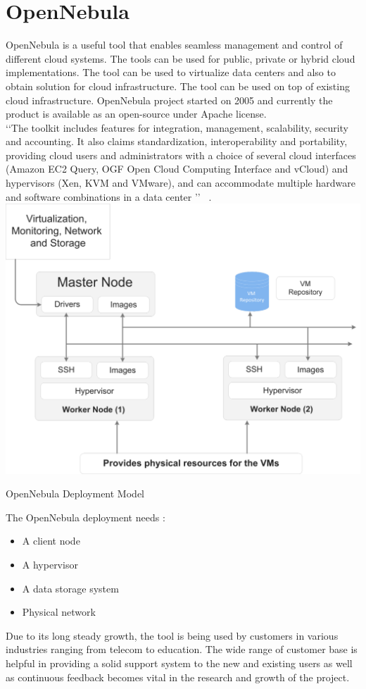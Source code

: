 \usepackage{graphicx}
\graphicspath{ {images/} }
\section{OpenNebula}

OpenNebula is a useful tool that enables seamless management and control of different cloud systems.
The tools can be used for public, private or hybrid cloud implementations.
The tool can be used to virtualize data centers and also to obtain solution for cloud infrastructure.
The tool can be used on top of existing cloud infrastructure.
OpenNebula project started on 2005 and currently the product is available as an open-source under Apache license. \\
‘‘The toolkit includes features for integration, management, scalability, security and accounting.
It also claims standardization, interoperability and portability, providing cloud users and administrators with a choice of several
cloud interfaces (Amazon EC2 Query, OGF Open Cloud Computing Interface and vCloud) and hypervisors
(Xen, KVM and VMware), and can accommodate multiple hardware and software combinations in a data center ’’
~\cite{hid-sp18-417-opennebula-wiki}.\\

\includegraphics{hid-sp18-417-opennebula}
\begin{center}
OpenNebula Deployment Model ~\cite{hid-sp18-417-opennebula-deployment} 
\end{center}

The OpenNebula deployment needs :
\begin{itemize}
\item        A client node
\item        A hypervisor
\item        A data storage system
\item        Physical network
\end{itemize}

Due to its long steady growth, the tool is being used by customers in various industries ranging from telecom to education.
The wide range of customer base is helpful in providing a solid support system to the new and existing users as well as continuous
feedback becomes vital in the research and growth of the project. 

